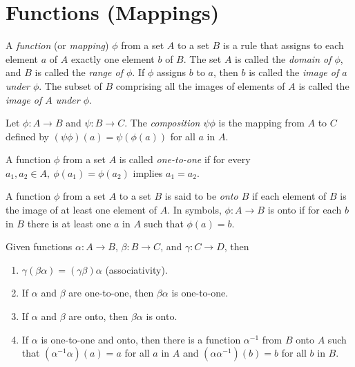 \section{Functions (Mappings)}

\begin{definition}
	A \textit{function} (or \textit{mapping}) $\phi$ from a set $A$ to a set $B$ is a rule that assigns to each element $a$ of $A$ exactly one element $b$ of $B$. The set $A$ is called the \textit{domain of $\phi$}, and $B$ is called the \textit{range of $\phi$}. If $\phi$ assigns $b$ to $a$, then $b$ is called the \textit{image of $a$ under $\phi$}. The subset of $B$ comprising all the images of elements of $A$ is called the \textit{image of $A$ under $\phi$}.
\end{definition}

\begin{definition}
	Let $\phi: A \to B$ and $\psi: B \to C$. The \textit{composition $\psi\phi$} is the mapping from $A$ to $C$ defined by $(\psi\phi)(a) = \psi(\phi(a))$ for all $a$ in $A$.
\end{definition}

\begin{definition}
	A function $\phi$ from a set $A$ is called \textit{one-to-one} if for every $a_1, a_2 \in A,\ \phi(a_1) = \phi(a_2)$ implies $a_1 = a_2$.
\end{definition}

\begin{definition}
	A function $\phi$ from a set $A$ to a set $B$ is said to be \textit{onto $B$} if each element of $B$ is the image of at least one element of $A$. In symbols, $\phi: A \to B$ is onto if for each $b$ in $B$ there is at least one $a$ in $A$ such that $\phi(a) = b$.
\end{definition}

\begin{theorem}
	Given functions $\alpha: A \to B$, $\beta: B \to C$, and $\gamma: C \to D$, then
	\begin{enumerate}
		\item $\gamma(\beta\alpha) = (\gamma\beta)\alpha$ (associativity).
		\item If $\alpha$ and $\beta$ are one-to-one, then $\beta\alpha$ is one-to-one.
		\item If $\alpha$ and $\beta$ are onto, then $\beta\alpha$ is onto.
		\item If $\alpha$ is one-to-one and onto, then there is a function $\alpha^{-1}$ from $B$ onto $A$ such that $(\alpha^{-1}\alpha)(a) = a$ for all $a$ in $A$ and $(\alpha\alpha^{-1})(b) = b$ for all $b$ in $B$.
	\end{enumerate}
\end{theorem}
